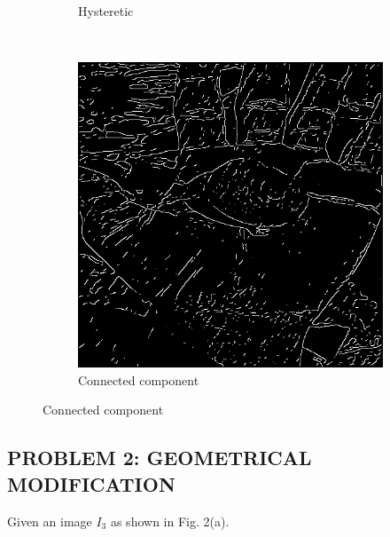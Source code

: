 \documentclass{article}
\begin{document}
\begin{enumerate}[label=(\alph*)]
\begin{figure}[!htb]
\begin{subfigure}[b]{0.3\textwidth}
            \caption{Hysteretic}
        \end{subfigure}
        ~
        \begin{subfigure}[b]{0.3\textwidth}
            \includegraphics[width=\textwidth]{img/E(noise).png}
            \caption{Connected component}
        \end{subfigure}
    \end{figure}
\end{enumerate}

\newpage
\subsection*{PROBLEM 2: GEOMETRICAL MODIFICATION}

Given an image $I_3$ as shown in Fig. 2(a).
\end{document}
